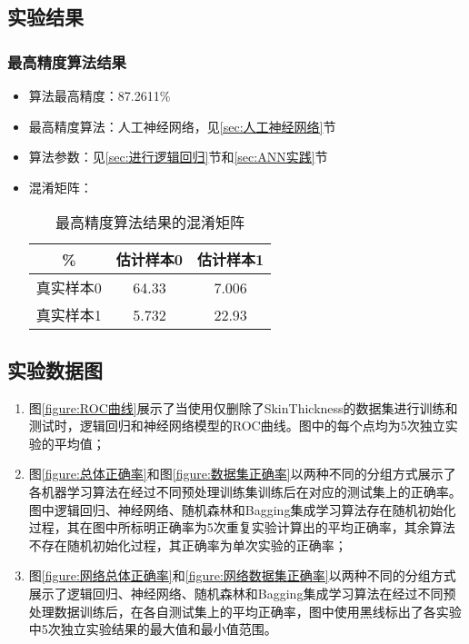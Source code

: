 \documentclass[a4paper]{ctexart}
\begin{document}
\subsection{实验结果}
\subsubsection{最高精度算法结果}
\begin{itemize}
	\item 算法最高精度：87.2611\%
	\item 最高精度算法：人工神经网络，见\ref{sec:人工神经网络}节
	\item 算法参数：见\ref{sec:进行逻辑回归}节和\ref{sec:ANN实践}节
	\item 混淆矩阵：
	\begin{table}[htbp]
		\centering
		\caption{最高精度算法结果的混淆矩阵}\label{tab:混淆矩阵}
		\begin{tabular}{|c|c|c|}
			\hline
			\%&估计样本0&估计样本1\\
			\hline
			真实样本0&64.33&7.006\\
			\hline
			真实样本1&5.732&22.93\\
			\hline
		\end{tabular}
	\end{table}
\end{itemize}

\subsection{实验数据图}
\begin{enumerate}
	\item 图\ref{figure:ROC曲线}展示了当使用仅删除了SkinThickness的数据集进行训练和测试时，逻辑回归和神经网络模型的ROC曲线。图中的每个点均为5次独立实验的平均值；
	\item 图\ref{figure:总体正确率}和图\ref{figure:数据集正确率}以两种不同的分组方式展示了各机器学习算法在经过不同预处理训练集训练后在对应的测试集上的正确率。图中逻辑回归、神经网络、随机森林和Bagging集成学习算法存在随机初始化过程，其在图中所标明正确率为5次重复实验计算出的平均正确率，其余算法不存在随机初始化过程，其正确率为单次实验的正确率；
	\item 图\ref{figure:网络总体正确率}和\ref{figure:网络数据集正确率}以两种不同的分组方式展示了逻辑回归、神经网络、随机森林和Bagging集成学习算法在经过不同预处理数据训练后，在各自测试集上的平均正确率，图中使用黑线标出了各实验中5次独立实验结果的最大值和最小值范围。
\end{enumerate}
\end{document}
